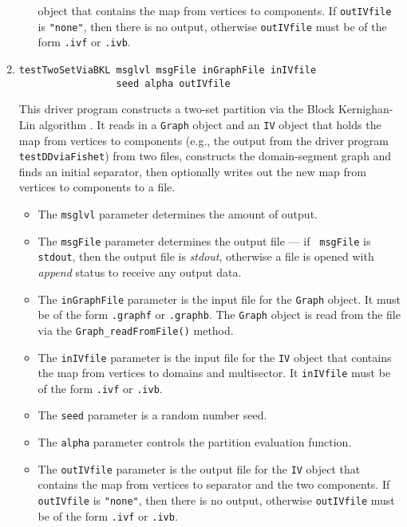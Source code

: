 \begin{enumerate}
\begin{itemize}
object that contains the map from vertices to components. 
If {\tt outIVfile} is {\tt "none"}, then there is no output,
otherwise {\tt outIVfile} 
must be of the form {\tt *.ivf} or {\tt *.ivb}.
\end{itemize}
\item
\begin{verbatim}
testTwoSetViaBKL msglvl msgFile inGraphFile inIVfile 
                 seed alpha outIVfile
\end{verbatim}
This driver program constructs a two-set partition via the 
Block Kernighan-Lin algorithm \cite{ash97-DDSEP}.
It reads in a {\tt Graph} object and an {\tt IV} object that holds
the map from vertices to components (e.g., the output from the
driver program {\tt testDDviaFishet}) from two files, 
constructs the domain-segment graph and finds an initial
separator, then optionally
writes out the new map from vertices to components to a file.
\par
\begin{itemize}
\item
The {\tt msglvl} parameter determines the amount of output.
\item
The {\tt msgFile} parameter determines the output file --- if {\tt
msgFile} is {\tt stdout}, then the output file is {\it stdout},
otherwise a file is opened with {\it append} status to receive any
output data.
\item
The {\tt inGraphFile} parameter is the input file for the {\tt Graph}
object. It must be of the form {\tt *.graphf} or {\tt *.graphb}.
The {\tt Graph} object is read from the file via the
{\tt Graph\_readFromFile()} method.
\item
The {\tt inIVfile} parameter is the input file for the {\tt IV}
object that contains the map from vertices to domains and multisector. 
It {\tt inIVfile} must be of the form {\tt *.ivf} or {\tt *.ivb}.
\item
The {\tt seed} parameter is a random number seed.
\item
The {\tt alpha} parameter controls the partition evaluation function.
\item
The {\tt outIVfile} parameter is the output file for the {\tt IV}
object that contains the map from vertices to separator and the 
two components. 
If {\tt outIVfile} is {\tt "none"}, then there is no output,
otherwise {\tt outIVfile} 
must be of the form {\tt *.ivf} or {\tt *.ivb}.
\end{itemize}

\end{enumerate}
